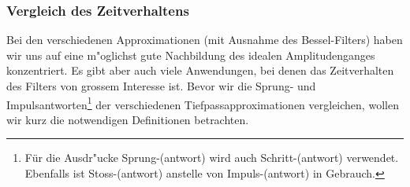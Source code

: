 \subsubsection{Vergleich des Zeitverhaltens}
Bei den verschiedenen Approximationen (mit Ausnahme des
Bessel-Filters) haben wir uns auf eine m"oglichst gute Nachbildung des
idealen Amplitudenganges konzentriert.
Es gibt aber auch viele Anwendungen, bei denen das Zeitverhalten des
Filters von grossem Interesse ist.  Bevor wir die Sprung- und
Impulsantworten\footnote{F\"ur die Ausdr"ucke Sprung-(antwort) wird
  auch Schritt-(antwort) verwendet. Ebenfalls ist Stoss-(antwort)
  anstelle von Impuls-(antwort) in
  Gebrauch.}
der verschiedenen Tiefpassapproximationen vergleichen, wollen wir kurz
die notwendigen Definitionen betrachten.\\
